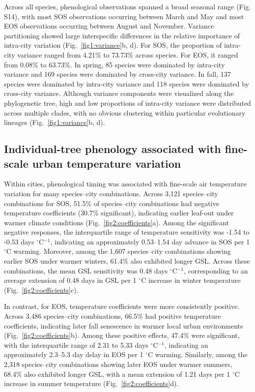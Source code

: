 Across all species, phenological observations spanned a broad seasonal range (Fig. S14), with most SOS observations occurring between March and May and most EOS observations occurring between August and November. Variance partitioning showed large interspecific differences in the relative importance of intra-city variation (Fig.~\ref{fig1:variance}b, d). For SOS, the proportion of intra-city variance ranged from 4.21\% to 73.73\% across species. For EOS, it ranged from 0.08\% to 63.73\%. In spring, 85 species were dominated by intra-city variance and 169 species were dominated by cross-city variance. In fall, 137 species were dominated by intra-city variance and 118 species were dominated by cross-city variance. Although variance components were visualized along the phylogenetic tree, high and low proportions of intra-city variance were distributed across multiple clades, with no obvious clustering within particular evolutionary lineages (Fig.~\ref{fig1:variance}b, d).



\subsection{Individual-tree phenology associated with fine-scale urban temperature variation}

Within cities, phenological timing was associated with fine-scale air temperature variation for many species--city combinations. Across 3,121 species--city combinations for SOS, 51.5\% of species--city combinations had negative temperature coefficients (30.7\% significant), indicating earlier leaf-out under warmer climate conditions (Fig.~\ref{fig2:coefficients}a). Among the significant negative responses, the interquartile range of temperature sensitivity was -1.54 to -0.53 days $^\circ$C$^{-1}$, indicating an approximately 0.53--1.54 day advance in SOS per 1 $^\circ$C warming. Moreover, among the 1,607 species--city combinations showing earlier SOS under warmer winters, 61.4\% also exhibited longer GSL. Across these combinations, the mean GSL sensitivity was 0.48 days $^\circ$C$^{-1}$, corresponding to an average extension of 0.48 days in GSL per 1 $^\circ$C increase in winter temperature (Fig.~\ref{fig2:coefficients}c).

In contrast, for EOS, temperature coefficients were more consistently positive. Across 3,486 species--city combinations, 66.5\% had positive temperature coefficients, indicating later fall senescence in warmer local urban environments (Fig.~\ref{fig2:coefficients}b). Among these positive effects, 47.4\% were significant, with the interquartile range of 2.31 to 5.33 days $^\circ$C$^{-1}$, indicating an approximately 2.3--5.3 day delay in EOS per 1 $^\circ$C warming. Similarly, among the 2,318 species--city combinations showing later EOS under warmer summers, 68.4\% also exhibited longer GSL, with a mean extension of 1.21 days per 1 $^\circ$C increase in summer temperature (Fig.~\ref{fig2:coefficients}d).


